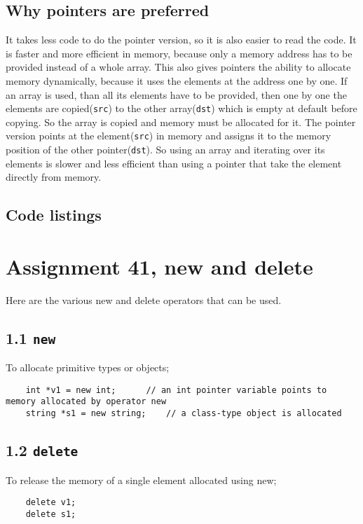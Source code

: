 \documentclass[11pt]{article}
\begin{document}
\subsection{Why pointers are preferred}
It takes less code to do the pointer version, so it is also easier to read the code.
It is faster and more efficient in memory, because only a memory address has to be provided instead of a whole array.
This also gives pointers the ability to allocate memory dynamically, because it uses the elements at the address one by one.
If an array is used, than all its elements have to be provided, then one by one the elements are copied(\texttt{src}) to the other array(\texttt{dst})
which is empty at default before copying. So the array is copied and memory must be allocated for it. 
The pointer version points at the element(\texttt{src}) in memory and assigns it to the memory position of the other pointer(\texttt{dst}).
So using an array and iterating over its elements is slower and less efficient than using a pointer that take the element directly from memory.


\subsection*{Code listings}


\section*{Assignment 41, new and delete}
Here are the various new and delete operators that can be used.

\subsection*{1.1 \texttt{new}}
To allocate primitive types or objects;
\begin{lstlisting}
	int *v1 = new int;		// an int pointer variable points to memory allocated by operator new
	string *s1 = new string;	// a class-type object is allocated
\end{lstlisting}

\subsection*{1.2 \texttt{delete}}
To release the memory of a single element allocated using new;
\begin{lstlisting}
	delete v1;
	delete s1;
\end{lstlisting}
\end{document}
